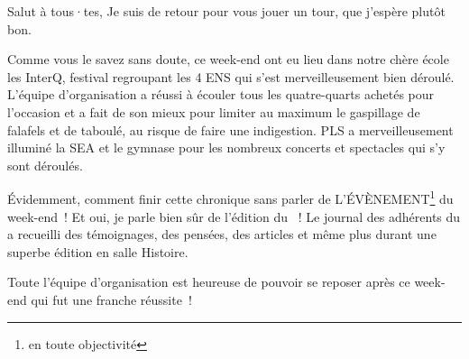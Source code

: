 
Salut à tous·tes, 
Je suis de retour pour vous jouer un tour, que j'espère plutôt bon. 

Comme vous le savez sans doute, ce week-end ont eu lieu dans notre chère école les InterQ, festival regroupant les 4 ENS qui s'est merveilleusement bien déroulé.
L'équipe d'organisation a réussi à écouler tous les quatre-quarts achetés pour l'occasion et a fait de son mieux pour limiter au maximum le gaspillage de falafels et de taboulé,
au risque de faire une indigestion. PLS a merveilleusement illuminé la SEA et le gymnase pour les nombreux concerts et spectacles qui s'y sont déroulés. 

Évidemment, comment finir cette chronique sans parler de L'ÉVÈNEMENT\footnote{en toute objectivité} du week-end~! Et oui, je parle bien sûr de l'édition du ~!
Le journal des adhérents du \cof{} a recueilli des témoignages, des pensées, des articles et même plus durant une superbe édition en salle Histoire. 

Toute l'équipe d'organisation est heureuse de pouvoir se reposer après ce week-end qui fut une franche réussite~!

\signature{Matthieu pour le \cof}
